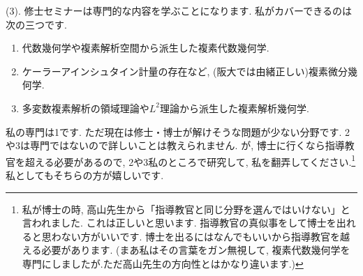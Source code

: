 (3). 修士セミナーは専門的な内容を学ぶことになります. 私がカバーできるのは次の三つです. 
\begin{enumerate}
  \setlength{\parskip}{0cm} %
  \setlength{\itemsep}{0pt} %
  \item 代数幾何学や複素解析空間から派生した複素代数幾何学. 
\item ケーラーアインシュタイン計量の存在など, (阪大では由緒正しい)複素微分幾何学.
\item 多変数複素解析の領域理論や$L^2$理論から派生した複素解析幾何学.
\end{enumerate}
私の専門は1です. ただ現在は修士・博士が解けそうな問題が少ない分野です.  
2や3は専門ではないので詳しいことは教えられません. 
が, 博士に行くなら指導教官を超える必要があるので, 2や3私のところで研究して, 私を翻弄してください.\footnote{私が博士の時, 高山先生から「指導教官と同じ分野を選んではいけない」と言われました. これは正しいと思います. 指導教官の真似事をして博士を出れると思わない方がいいです. 博士を出るにはなんでもいいから指導教官を越える必要があります. (まあ私はその言葉をガン無視して, 複素代数幾何学を専門にしましたが.ただ高山先生の方向性とはかなり違います.)} 
私としてもそちらの方が嬉しいです. 

